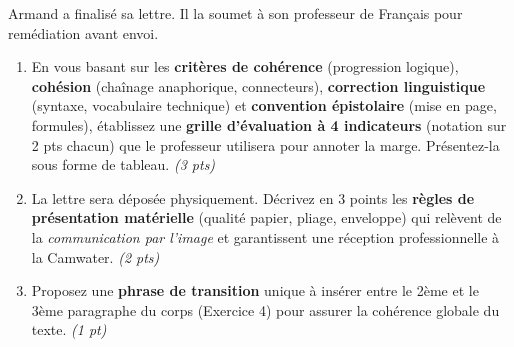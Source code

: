 \documentclass[11pt]{article}
\begin{document}
\begin{exercice}
Armand a finalisé sa lettre. Il la soumet à son professeur de Français pour remédiation avant envoi.

\begin{enumerate}
    \item En vous basant sur les \textbf{critères de cohérence} (progression logique), \textbf{cohésion} (chaînage anaphorique, connecteurs), \textbf{correction linguistique} (syntaxe, vocabulaire technique) et \textbf{convention épistolaire} (mise en page, formules), établissez une \textbf{grille d'évaluation à 4 indicateurs} (notation sur 2 pts chacun) que le professeur utilisera pour annoter la marge. Présentez-la sous forme de tableau. \textit{(3 pts)}
    
    \item La lettre sera déposée physiquement. Décrivez en 3 points les \textbf{règles de présentation matérielle} (qualité papier, pliage, enveloppe) qui relèvent de la \textit{communication par l'image} et garantissent une réception professionnelle à la Camwater. \textit{(2 pts)}
    
    \item Proposez une \textbf{phrase de transition} unique à insérer entre le 2ème et le 3ème paragraphe du corps (Exercice 4) pour assurer la cohérence globale du texte. \textit{(1 pt)}
\end{enumerate}
\end{exercice}
\end{document}
